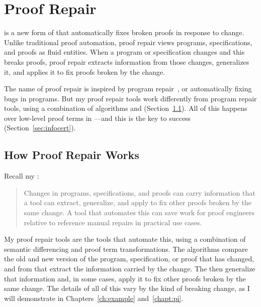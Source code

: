 \section{Proof Repair}
\label{sec:mot-rep}

 is a new form of  that automatically fixes broken proofs in response to change.
Unlike traditional proof automation, proof repair views programs, specifications, and proofs as fluid entities.
When a program or specification changes and this breaks proofs, proof repair extracts information from those
changes, generalizes it, and applies it to fix proofs broken by the change.

The name of proof repair is inspired by program repair~\cite{Monperrus:2018:ASR:3177787.3105906, Gazzola:2018:ASR:3180155.3182526},
or automatically fixing bugs in programs.
But my proof repair tools work differently from program repair tools, 
using a combination of  algorithms and  (Section~\ref{sec:how}).
All of this happens over low-level proof terms in ---and this is the key to success (Section~\ref{sec:infocert}).

\subsection{How Proof Repair Works}
\label{sec:how}

Recall my :

\begin{quote}
Changes in programs, specifications, and proofs can carry information that a tool can extract, generalize, and apply to fix other proofs broken by the same change. A tool that automates this can save work for proof engineers relative to reference manual repairs in practical use cases.
\end{quote}
My proof repair tools are the tools that automate this,
using a combination of semantic differencing and proof term transformations.
The  algorithms compare the old and new version of the program, specification, or proof that has changed,
and from that extract the information carried by the change.
The  then generalize that information and, in some cases, apply it to fix other proofs broken by the same change.
The details of all of this vary by the kind of breaking change,
as I will demonstrate in Chapters~\ref{ch:example} and~\ref{chapt:pi}.


